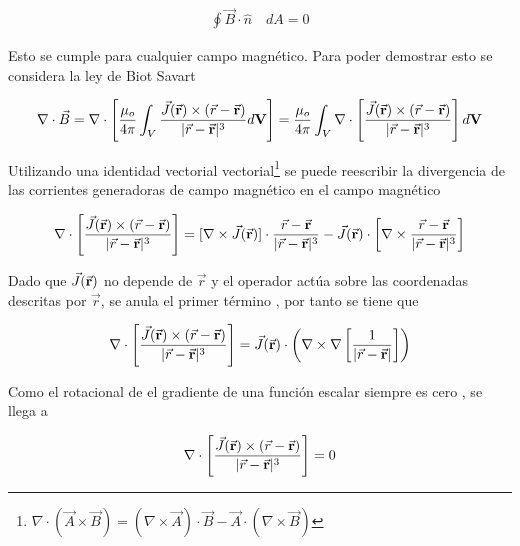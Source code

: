 \begin{eqnarray}
    \oint \vec{B}\cdot\hat{n}\quad dA = 0
\end{eqnarray}

Esto se cumple para cualquier campo magnético. Para poder demostrar esto se considera la ley de Biot Savart \cite{kleber}

\begin{eqnarray}
    \nabla\cdot\vec{B} = \nabla\cdot\left[\frac{\mu_{o}}{4\pi}\int_{V}\frac{\vec{J}(\vec{\bf{r}})\times(\vec{r}-\vec{\bf{r}})}{|\vec{r}-\vec{\bf{r}}|^{3}}d\bf{V}\right] = \frac{\mu_{o}}{4\pi}\int_{V}\nabla\cdot\left[\frac{\vec{J}(\vec{\bf{r}})\times(\vec{r}-\vec{\bf{r}})}{|\vec{r}-\vec{\bf{r}}|^{3}}\right]d\bf{V}
\end{eqnarray}

Utilizando una identidad vectorial vectorial\footnote{$\nabla\cdot(\vec{A}\times \vec{B}) = (\nabla \times \vec{A})\cdot \vec{B} - \vec{A}\cdot(\nabla \times \vec{B})$} se puede reescribir la divergencia de las corrientes generadoras de campo magnético en el campo magnético

\begin{eqnarray}
    \nabla\cdot\left[\frac{\vec{J}(\vec{\bf{r}})\times(\vec{r}-\vec{\bf{r}})}{|\vec{r}-\vec{\bf{r}}|^{3}}\right] = [\nabla \times \vec{J}(\vec{\bf{r}})]\cdot \frac{\vec{r}-\vec{\bf{r}}}{|\vec{r}-\vec{\bf{r}}|^{3}}- \vec{J}(\vec{\bf{r}})\cdot\left[\nabla\times\frac{\vec{r}-\vec{\bf{r}}}{|\vec{r}-\vec{\bf{r}}|^{3}}\right]
\end{eqnarray}

Dado que $\vec{J}(\vec{\bf{r}})$ no depende de $\vec{r}$ y el operador actúa sobre las coordenadas descritas por $\vec{r}$, se anula el primer término , por tanto se tiene que 

\begin{eqnarray}
     \nabla\cdot\left[\frac{\vec{J}(\vec{\bf{r}})\times(\vec{r}-\vec{\bf{r}})}{|\vec{r}-\vec{\bf{r}}|^{3}}\right] = \vec{J}(\vec{\bf{r}})\cdot\left(\nabla\times\nabla\left[\frac{1}{|\vec{r}-\vec{\bf{r}}|}\right]\right)
\end{eqnarray}

Como el rotacional de el gradiente de una función escalar siempre es cero \cite{Arfken}, se llega a 

\begin{eqnarray}
    \nabla\cdot\left[\frac{\vec{J}(\vec{\bf{r}})\times(\vec{r}-\vec{\bf{r}})}{|\vec{r}-\vec{\bf{r}}|^{3}}\right] = 0
\end{eqnarray}

